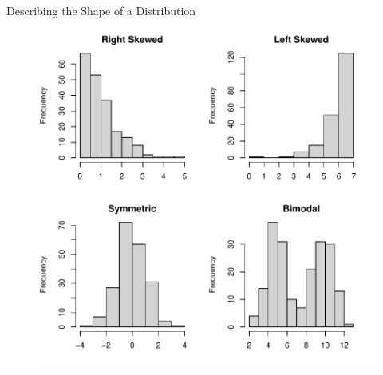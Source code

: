 \documentclass{beamer}
\begin{document}
\begin{frame}{Describing the Shape of a Distribution}
\begin{figure}[htbp]
\centering
\includegraphics[scale = 0.5]{figure/shapes.pdf}
\end{figure}
\end{frame}

% 
\end{document}
